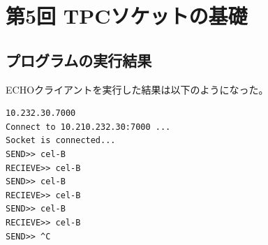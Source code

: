 \documentclass[a4j]{celb-report}
\begin{document}

%

\section{第5回 TPCソケットの基礎}
\subsection{プログラムの実行結果}
ECHOクライアントを実行した結果は以下のようになった。
\begin{lstlisting}[basicstyle=\ttfamily\footnotesize, frame=single]
10.232.30.7000
Connect to 10.210.232.30:7000 ...
Socket is connected...
SEND>> cel-B
RECIEVE>> cel-B
SEND>> cel-B
RECIEVE>> cel-B
SEND>> cel-B
RECIEVE>> cel-B
SEND>> ^C
\end{lstlisting}

\end{document}
